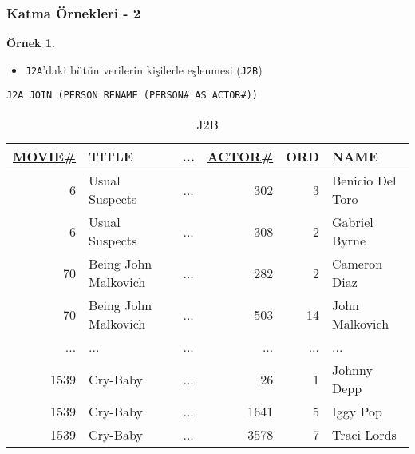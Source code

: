\documentclass[dvipsnames]{beamer}
\theoremstyle{definition}
\theoremstyle{example}
\newtheorem{ornek}[theorem]{Örnek}
\theoremstyle{plain}
\begin{document}
\begin{frame}[fragile]
  \frametitle{Katma Örnekleri - 2}

  \begin{ornek}
    \begin{itemize}
      \item \texttt{J2A}'daki bütün verilerin kişilerle eşlenmesi (\texttt{J2B})
    \end{itemize}

    \begin{lstlisting}
J2A JOIN (PERSON RENAME (PERSON# AS ACTOR#))
    \end{lstlisting}

    \pause
    \vspace{-10pt}
    \begin{tiny}
    \begin{table}
      \caption{J2B}
      \begin{tabular}{|r|l|c|r|r|l|}\hline
\underline{MOVIE\#} & TITLE & ... & \underline{ACTOR\#} & ORD & NAME\\[2pt]\hline\hline
   6 & Usual Suspects       & ... &     302 &   3 & Benicio Del Toro\\\hline
   6 & Usual Suspects       & ... &     308 &   2 & Gabriel Byrne   \\\hline
  70 & Being John Malkovich & ... &     282 &   2 & Cameron Diaz    \\\hline
  70 & Being John Malkovich & ... &     503 &  14 & John Malkovich  \\\hline
 ... & ...                  & ... &     ... & ... & ...             \\\hline
1539 & Cry-Baby             & ... &      26 &   1 & Johnny Depp     \\\hline
1539 & Cry-Baby             & ... &    1641 &   5 & Iggy Pop        \\\hline
1539 & Cry-Baby             & ... &    3578 &   7 & Traci Lords     \\\hline
      \end{tabular}
    \end{table}
    \end{tiny}
  \end{ornek}
\end{frame}
\end{document}
